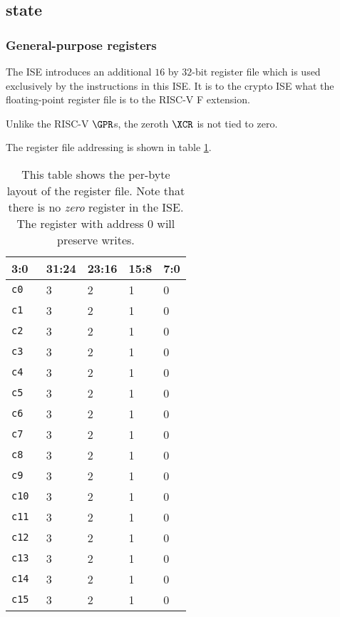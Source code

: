 \subsection{\XCID state}
\label{sec:spec:state}


\subsubsection{General-purpose registers}
\label{sec:spec:state:gpr}

The ISE introduces an additional $16$ by $32$-bit register file which
is used exclusively by the instructions in this ISE.
It is to the crypto ISE what the floating-point register file is to the
RISC-V F extension.

Unlike the RISC-V $\GPR$s, the zeroth $\XCR$ is not tied to zero.

The register file addressing is shown in table \ref{tab:state-addr}.

\begin{table}[t]
\centering
\begin{tabular}{|l|l l l l|}
\hline
\multicolumn{1}{|l|}{3:0} & \textbf{31:24} & \textbf{23:16} & \textbf{15:8} & \textbf{7:0} \\ \hline
{\tt c0  } & 3 & 2 & 1 & 0      \\ \hline
{\tt c1  } & 3 & 2 & 1 & 0      \\ \hline
{\tt c2  } & 3 & 2 & 1 & 0      \\ \hline
{\tt c3  } & 3 & 2 & 1 & 0      \\ \hline
{\tt c4  } & 3 & 2 & 1 & 0      \\ \hline
{\tt c5  } & 3 & 2 & 1 & 0      \\ \hline
{\tt c6  } & 3 & 2 & 1 & 0      \\ \hline
{\tt c7  } & 3 & 2 & 1 & 0      \\ \hline
{\tt c8  } & 3 & 2 & 1 & 0      \\ \hline
{\tt c9  } & 3 & 2 & 1 & 0      \\ \hline
{\tt c10 } & 3 & 2 & 1 & 0      \\ \hline
{\tt c11 } & 3 & 2 & 1 & 0      \\ \hline
{\tt c12 } & 3 & 2 & 1 & 0      \\ \hline
{\tt c13 } & 3 & 2 & 1 & 0      \\ \hline
{\tt c14 } & 3 & 2 & 1 & 0      \\ \hline
{\tt c15 } & 3 & 2 & 1 & 0      \\ \hline
\end{tabular}
\caption{This table shows the per-byte layout of the register file.
Note that there is no {\em zero} register in the ISE.
The register with address $0$ will preserve writes.}
\label{tab:state-addr}
\end{table}

